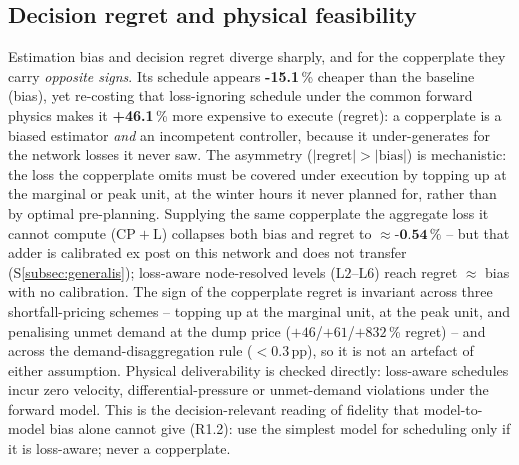 \documentclass[a4paper,fleqn]{cas-dc}
\newcommand{\CPL}{\ensuremath{\mathrm{CP{+}L}}} %
\newcommand{\Ltwo}{\ensuremath{\mathrm{L2}}}    %
\newcommand{\Lsix}{\ensuremath{\mathrm{L6}}}    %
\begin{document}
\subsection{Decision regret and physical feasibility}
Estimation bias and decision regret diverge sharply, and for the copperplate they
carry \emph{opposite signs}. Its schedule appears \textbf{-15.1}\,\% cheaper
than the baseline (bias), yet re-costing that loss-ignoring schedule under the common
forward physics makes it \textbf{+46.1}\,\% more expensive to execute
(regret): a copperplate is a biased estimator \emph{and} an incompetent controller,
because it under-generates for the network losses it never saw. The asymmetry
($|\text{regret}|>|\text{bias}|$) is mechanistic: the loss the copperplate omits must
be covered under execution by topping up at the marginal or peak unit, at the winter
hours it never planned for, rather than by optimal pre-planning. Supplying the same
copperplate the aggregate loss it cannot compute (\CPL) collapses both bias and regret
to $\approx\textbf{-0.54}\,\%$ -- but that adder is calibrated ex post on this
network and does not transfer (S\ref{subsec:generalis}); loss-aware node-resolved levels
(\Ltwo--\Lsix) reach regret $\approx$ bias with no calibration. The sign of the
copperplate regret is invariant across three shortfall-pricing schemes -- topping up at
the marginal unit, at the peak unit, and penalising unmet demand at the dump price
($+46$/$+61$/$+832$\,\% regret) -- and across the demand-disaggregation rule
($<0.3$\,pp), so it is not an artefact of either assumption. Physical deliverability is
checked directly: loss-aware schedules incur zero velocity, differential-pressure or
unmet-demand violations under the forward model. This is the decision-relevant reading of
fidelity that model-to-model bias alone cannot give (R1.2): use the simplest model for
scheduling only if it is loss-aware; never a copperplate.

\end{document}
